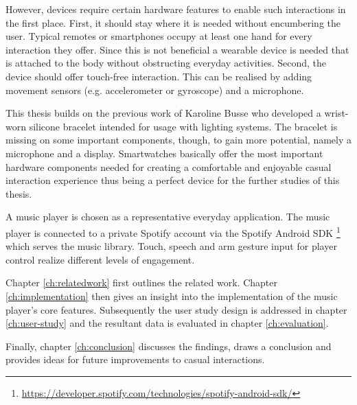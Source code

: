 However, devices require certain hardware features to enable such interactions in the first place. First, it should stay where it is needed without encumbering the user. Typical remotes or smartphones occupy at least one hand for every interaction they offer. Since this is not beneficial a wearable device is needed that is attached to the body without obstructing everyday activities.
Second, the device should offer touch-free interaction. This can be realised by adding movement sensors (e.g. accelerometer or gyroscope) and a microphone.\cite{Busse2014Thesis}

This thesis builds on the previous work of Karoline Busse \cite{Busse2014Thesis} who developed a wrist-worn silicone bracelet intended for usage with lighting systems. The bracelet is missing on some important components, though, to gain more potential, namely a microphone and a display. Smartwatches basically offer the most important hardware components needed for creating a comfortable and enjoyable casual interaction experience thus being a perfect device for the further studies of this thesis.

A music player is chosen as a representative everyday application. The music player is connected to a private Spotify account via the Spotify Android \ac{SDK} \footnote{\url{https://developer.spotify.com/technologies/spotify-android-sdk/}} which serves the music library. Touch, speech and arm gesture input for player control realize different levels of engagement.

Chapter \ref{ch:relatedwork} first outlines the related work. Chapter \ref{ch:implementation} then gives an insight into the implementation of the music player's core features. Subsequently the user study design is addressed in chapter \ref{ch:user-study} and the resultant data is evaluated in chapter \ref{ch:evaluation}.

Finally, chapter \ref{ch:conclusion} discusses the findings, draws a conclusion and provides ideas for future improvements to casual interactions.







